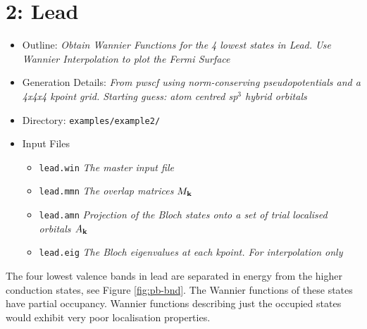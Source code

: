 \documentclass[a4paper,11pt,twoside]{article}
\begin{document}
\cleardoublepage



\section*{2: Lead}

\begin{itemize}
\item{Outline: \it{Obtain Wannier Functions for the 4 lowest states in Lead. Use Wannier
Interpolation to plot the Fermi Surface}}
\item{Generation Details: \it{From pwscf using norm-conserving pseudopotentials
and a 4x4x4 kpoint grid. Starting guess: atom centred sp$^3$ hybrid orbitals}}
\item{Directory: {\tt examples/example2/}}
\item{Input Files}
\begin{itemize}
\item{ {\tt lead.win}  {\it The master input file}}
\item{ {\tt lead.mmn}  {\it The overlap matrices $M_{{\bf k}}$}}
\item{ {\tt lead.amn}  {\it Projection of the Bloch states onto a set of trial localised orbitals $A_{{\bf k}}$}}
\item{ {\tt lead.eig}  {\it The Bloch eigenvalues at each kpoint. For interpolation only}}
\end{itemize}

\end{itemize}
The four lowest valence bands in lead are separated in energy from the higher conduction states, see Figure \ref{fig:pb-bnd}. The Wannier functions of these states have partial occupancy. Wannier functions describing just the occupied states would exhibit very poor localisation properties.
\end{document}
